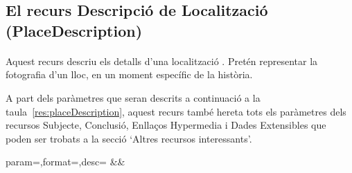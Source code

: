 \subsection{El recurs Descripció de Localització (PlaceDescription)}

    \paragraph{}
    Aquest recurs descriu els detalls d'una localització . Pretén representar la fotografia d'un lloc, en un moment específic de la història.

    A part dels paràmetres que seran descrits a continuació a la taula~\ref{res:placeDescription}, aquest recurs també hereta tots els paràmetres dels recursos Subjecte, Conclusió, Enllaços Hypermedia i Dades Extensibles que poden ser trobats a la secció `Altres recursos interessants'.

    \begin{center}
             {param=\param,format=\format,desc=\desc}
             {\param&\format&\desc}
     \end{center}
